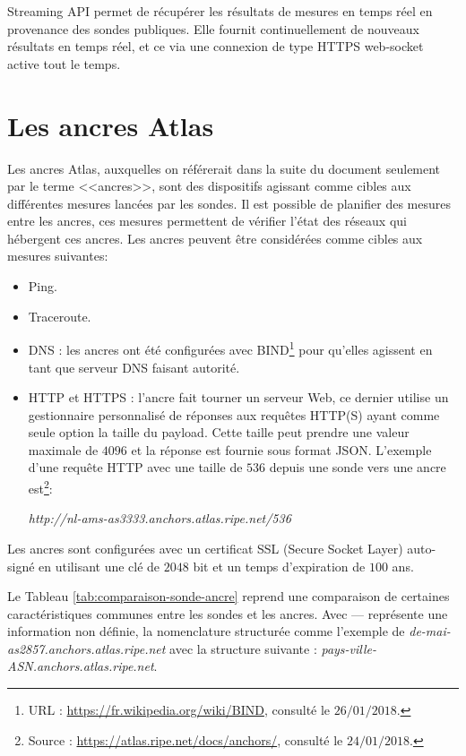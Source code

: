 Streaming API permet de récupérer les résultats de mesures en temps réel en provenance des sondes publiques. Elle  fournit continuellement de nouveaux résultats en temps réel, et ce  via une connexion de type HTTPS web-socket active tout le temps.
\section{Les ancres Atlas} \label{subsec:ancre}
Les ancres Atlas, auxquelles on référerait dans la suite du document seulement par le terme <<ancres>>, sont des dispositifs agissant comme cibles aux différentes mesures lancées par les sondes. Il est possible de planifier des mesures entre les ancres, ces mesures permettent de vérifier l'état des réseaux qui hébergent ces ancres. Les ancres  peuvent être considérées comme  cibles aux mesures suivantes:
\begin{itemize}
	\item Ping.
	\item Traceroute.
	\item DNS : les ancres ont été configurées avec BIND\footnote{URL : \url{https://fr.wikipedia.org/wiki/BIND}, consulté le $26/01/2018$.} pour qu'elles agissent en tant que serveur DNS faisant autorité.
	\item HTTP et HTTPS : l'ancre fait tourner un serveur Web, ce dernier utilise un gestionnaire  personnalisé de réponses aux requêtes HTTP(S) ayant comme seule option la taille du payload. 	 Cette taille peut prendre une valeur maximale de $4096$ et la réponse est fournie sous format JSON. L'exemple d'une requête HTTP avec une taille de $536$ depuis une sonde  vers une ancre  est\footnote{Source : \url{https://atlas.ripe.net/docs/anchors/}, consulté le $24/01/2018$.}: 
	\begin{tcolorbox}
		\textit{http://nl-ams-as3333.anchors.atlas.ripe.net/536}
	\end{tcolorbox}
\end{itemize}
Les ancres sont configurées avec un certificat SSL (Secure Socket Layer)  auto-signé en utilisant une clé de $2048$ bit et un temps d'expiration de $100$ ans. 

Le Tableau \ref{tab:comparaison-sonde-ancre} reprend une comparaison de certaines caractéristiques communes entre les sondes et les ancres. Avec --- représente une information non définie, la nomenclature structurée comme l'exemple de \textit{de-mai-as2857.anchors.atlas.ripe.net} avec la structure suivante : \textit{pays-ville-ASN.anchors.atlas.ripe.net}.


